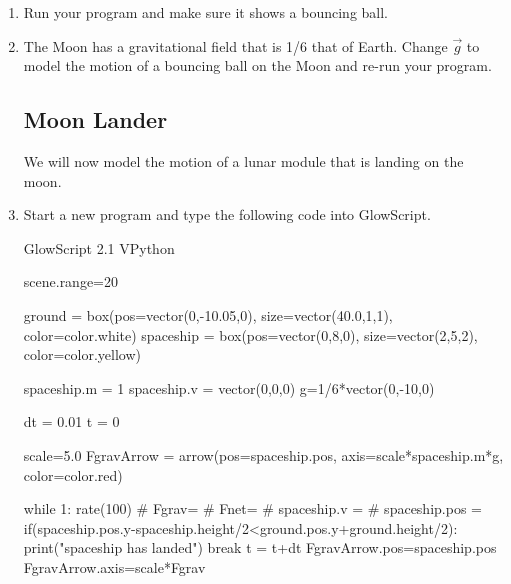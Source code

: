 \begin{enumerate}
\item Run your program and make sure it shows a bouncing ball.




\item The Moon has a gravitational field that is 1/6 that of Earth. Change $\vec{g}$ to model the motion of a bouncing ball on the Moon and re-run your program.


\subsection*{Moon Lander}

We will now model the motion of a lunar module that is landing on the moon. 


\item Start a new program and type the following code into GlowScript.

\begin{myvpython}
GlowScript 2.1 VPython

scene.range=20

ground = box(pos=vector(0,-10.05,0), size=vector(40.0,1,1), color=color.white)
spaceship = box(pos=vector(0,8,0), size=vector(2,5,2), color=color.yellow)

spaceship.m = 1
spaceship.v = vector(0,0,0)
g=1/6*vector(0,-10,0)

dt = 0.01
t = 0

scale=5.0
FgravArrow = arrow(pos=spaceship.pos, axis=scale*spaceship.m*g, color=color.red)

while 1:
    rate(100)
#    Fgrav=
#    Fnet=
#    spaceship.v = 
#    spaceship.pos = 
    if(spaceship.pos.y-spaceship.height/2<ground.pos.y+ground.height/2):
            print("spaceship has landed")
            break
    t = t+dt
    FgravArrow.pos=spaceship.pos
    FgravArrow.axis=scale*Fgrav
\end{myvpython}


\end{enumerate}

